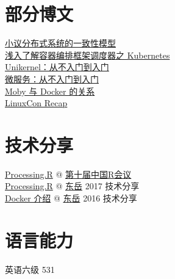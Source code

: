 \documentclass[]{deedy-resume-openfont}
\begin{document}
\begin{minipage}[t]{0.3\textwidth}
\section{部分博文}
\sectionsep

\href{http://gaocegege.com/Blog/%E9%9A%8F%E7%AC%94/consistency}{小议分布式系统的一致性模型} \\
\href{http://gaocegege.com/Blog/%E6%BA%90%E7%A0%81%E5%88%86%E6%9E%90/kubernetes-scheduler}{浅入了解容器编排框架调度器之 Kubernetes} \\
\href{http://gaocegege.com/Blog/%E5%AE%89%E5%88%A9/unikernel-book}{Unikernel：从不入门到入门} \\
\href{http://gaocegege.com/Blog/%E5%AE%89%E5%88%A9/micro-services}{微服务：从不入门到入门} \\
\href{http://gaocegege.com/Blog/moby/moby}{Moby 与 Docker 的关系
} \\
\href{http://gaocegege.com/Blog/%E9%9A%8F%E7%AC%94/linuxcon}{LinuxCon Recap} \\
\sectionsep

\section{技术分享}
\sectionsep
\href{http://slides.com/gaocegege/processing-r}{Processing.R} @ \href{http://china-r.org/sh2017/index.html}{第十届中国R会议} \\
\href{https://docs.google.com/presentation/d/1ylRT4VvydWbR7SyTQzNZOLpkXtgSZJiEl5nmXY1KuJw/edit?usp=sharing}{Processing.R} @ \href{https://zhuanlan.zhihu.com/dongyue}{东岳} 2017 技术分享 \\
\href{https://docs.google.com/presentation/d/1Ru4Dm9TLoyxnJgFqvsCHrb82VT622H-zBSgAe1vJL44/edit?usp=sharing}{Docker 介绍}  @ \href{https://zhuanlan.zhihu.com/dongyue}{东岳} 2016 技术分享 \\
\sectionsep

\section{语言能力}
\sectionsep
英语六级 531 \\
\sectionsep



\end{minipage}
\end{document}
